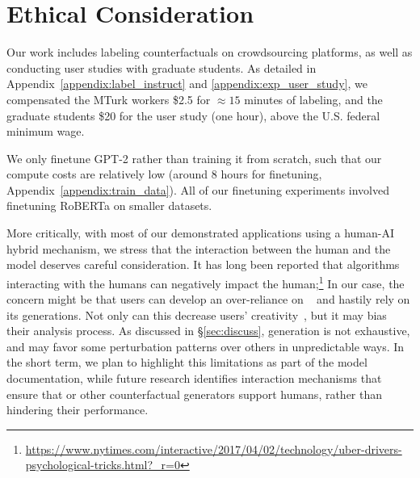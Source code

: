 
\section{Ethical Consideration}
Our work includes labeling counterfactuals on crowdsourcing platforms, as well as conducting user studies with graduate students.
As detailed in Appendix~\ref{appendix:label_instruct} and \ref{appendix:exp_user_study}, we compensated the MTurk workers \$2.5 for ${\approx}15$ minutes of labeling, and the graduate students \$20 for the user study (one hour), above the U.S. federal minimum wage.

We only finetune GPT-2 rather than training it from scratch, such that our compute costs are relatively low (around 8 hours for finetuning, Appendix~\ref{appendix:train_data}). All of our finetuning experiments involved finetuning RoBERTa on smaller datasets.

More critically, with most of our demonstrated applications using a human-AI hybrid mechanism, we stress that the interaction between the human and the model deserves careful consideration.
It has long been reported that algorithms interacting with the humans can negatively impact the human;\footnote{\url{https://www.nytimes.com/interactive/2017/04/02/technology/uber-drivers-psychological-tricks.html?_r=0}}
In our case, the concern might be that users can develop an over-reliance on \sysname~\cite{bansal2021does} and hastily rely on its generations.
Not only can this decrease users' creativity~\cite{green-etal-2014-human}, but it may bias their analysis process.
As discussed in \S\ref{sec:discuss}, \sysname generation is not exhaustive, and may favor some perturbation patterns over others in unpredictable ways.
In the short term, we plan to highlight this limitations as part of the model documentation, while future research identifies interaction mechanisms that ensure that \sysname or other counterfactual generators support humans, rather than hindering their performance.



